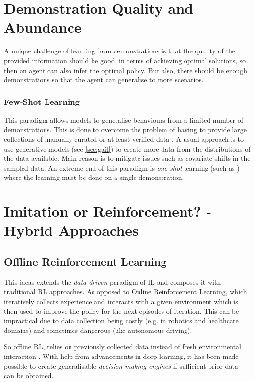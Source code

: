 \section{Demonstration Quality and Abundance}
A unique challenge of learning from demonstrations is that the quality of the provided information should be good, in terms of achieving optimal solutions, so then an agent can also infer the optimal policy. But also, there should be enough demonstrations so that the agent can generalise to more scenarios.

\subsubsection{Few-Shot Learning}\label{sec:few-shot}
This paradigm allows models to generalise behaviours from a limited number of demonstrations. This is done to overcome the problem of having to provide large collections of manually curated or at least verified data \cite{fewshotsurvey}. A usual approach is to use generative models (see \ref{sec:gail}) to create more data from the distributions of the data available. Main reason is to mitigate issues such as covariate shifts in the sampled data. An extreme end of this paradigm is \emph{one-shot} learning (such as \cite{vitiello2023one}) where the learning must be done on a single demonstration.

\section{Imitation or Reinforcement? - Hybrid Approaches}

\subsection{Offline Reinforcement Learning}
This ideas extends the \emph{data-driven} paradigm of IL and composes it with traditional RL approaches. As opposed to Online Reinforcement Learning, which iteratively collects experience and interacts with a given environment which is then used to improve the policy for the next episodes of iteration. This can be impractical due to data collection being costly (e.g. in robotics and healthcare domains) and sometimes dangerous (like autonomous driving). 

So offline RL, relies on previously collected data instead of fresh environmental interaction \cite{levine2020offlinereinforcementlearningtutorial}. With help from advancements in deep learning, it has been made possible to create generalisable \emph{decision making engines} \cite{levine2020offlinereinforcementlearningtutorial} if sufficient prior data can be obtained.

